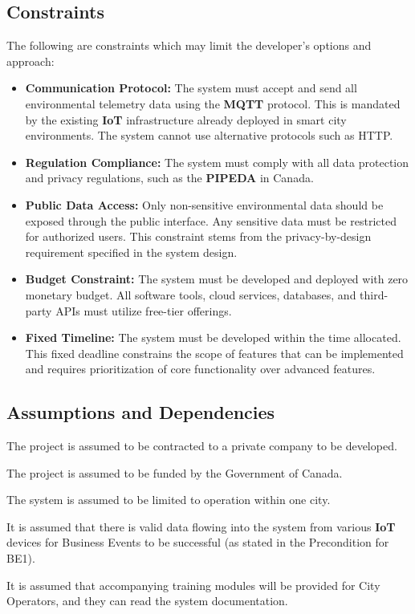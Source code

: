\documentclass[]{article}
\begin{document}
\subsection{Constraints}
\label{sub:constraints}
The following are constraints which may limit the developer's options and approach:
\begin{itemize}
	\item[] \textbf{Communication Protocol:} The system must accept and send all environmental telemetry data using the \textbf{MQTT} protocol. This is mandated by the existing \textbf{IoT} infrastructure already deployed in smart city environments. The system cannot use alternative protocols such as HTTP.
	\item[] \textbf{Regulation Compliance:} The system must comply with all data protection and privacy regulations, such as the \textbf{PIPEDA} in Canada. 
	\item[] \textbf{Public Data Access:} Only non-sensitive environmental data should be exposed through the public interface. Any sensitive data must be restricted for authorized users. This constraint stems from the privacy-by-design requirement specified in the system design.
	\item[] \textbf{Budget Constraint:} The system must be developed and deployed with zero monetary budget. All software tools, cloud services, databases, and third-party APIs must utilize free-tier offerings.
	\item[] \textbf{Fixed Timeline:} The system must be developed within the time allocated. This fixed deadline constrains the scope of features that can be implemented and requires prioritization of core functionality over advanced features.
\end{itemize}

\subsection{Assumptions and Dependencies}
\label{sub:assumptions_and_dependencies}
\begin{enumerate}
	{\color{red}\item The project is assumed to be contracted to a private company to be developed. }
	\item The project is assumed to be funded by the Government of Canada.
	\item The system is assumed to be limited to operation within one city.
	\item It is assumed that there is valid data flowing into the system from various \textbf{IoT} devices for Business Events to be successful (as stated in the Precondition for BE1).
	\item It is assumed that accompanying training modules will be provided for City Operators, and they can read the system documentation.
\end{enumerate}
\end{document}
